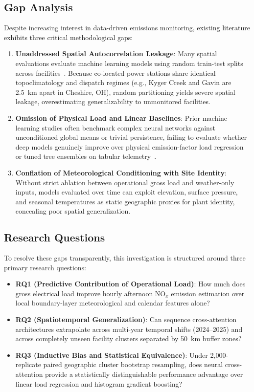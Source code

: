 \documentclass[conference]{IEEEtran}
\begin{document}
\subsection{Gap Analysis}
\label{sec:gap_analysis}
Despite increasing interest in data-driven emissions monitoring, existing literature exhibits three critical methodological gaps:
\begin{enumerate}
    \item \textbf{Unaddressed Spatial Autocorrelation Leakage}: Many spatial evaluations evaluate machine learning models using random train-test splits across facilities~\cite{roberts2017,meyer2018}. Because co-located power stations share identical topoclimatology and dispatch regimes (e.g., Kyger Creek and Gavin are 2.5~km apart in Cheshire, OH), random partitioning yields severe spatial leakage, overestimating generalizability to unmonitored facilities.
    \item \textbf{Omission of Physical Load and Linear Baselines}: Prior machine learning studies often benchmark complex neural networks against unconditioned global means or trivial persistence, failing to evaluate whether deep models genuinely improve over physical emission-factor load regression or tuned tree ensembles on tabular telemetry~\cite{grinsztajn2022why,shwartzziv2022tabular}.
    \item \textbf{Conflation of Meteorological Conditioning with Site Identity}: Without strict ablation between operational gross load and weather-only inputs, models evaluated over time can exploit elevation, surface pressure, and seasonal temperatures as static geographic proxies for plant identity, concealing poor spatial generalization.
\end{enumerate}

\subsection{Research Questions}
\label{sec:rqs}
To resolve these gaps transparently, this investigation is structured around three primary research questions:
\begin{itemize}
    \item \textbf{RQ1 (Predictive Contribution of Operational Load)}: How much does gross electrical load improve hourly afternoon $\text{NO}_x$ emission estimation over local boundary-layer meteorological and calendar features alone?
    \item \textbf{RQ2 (Spatiotemporal Generalization)}: Can sequence cross-attention architectures extrapolate across multi-year temporal shifts (2024--2025) and across completely unseen facility clusters separated by 50~km buffer zones?
    \item \textbf{RQ3 (Inductive Bias and Statistical Equivalence)}: Under 2,000-replicate paired geographic cluster bootstrap resampling, does neural cross-attention provide a statistically distinguishable performance advantage over linear load regression and histogram gradient boosting?
\end{itemize}
\end{document}
